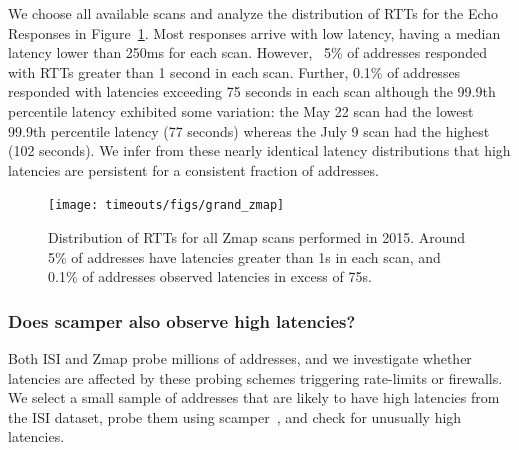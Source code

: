 We choose all
available scans and 
analyze the distribution of
RTTs for the Echo Responses in
Figure~\ref{fig:grand_zmap}. 
%
Most responses arrive with low latency, having a median latency lower than
250ms for each scan.
%
However, ~5\% of addresses responded with RTTs greater than 1 second
in each scan. Further, 0.1\% of addresses responded with latencies exceeding
75 seconds in each scan although the 99.9th percentile
latency exhibited some variation: the May 22 scan had the lowest 99.9th percentile
latency (77 seconds) whereas the July 9 scan had the highest (102 seconds).
%
We infer from these nearly identical latency distributions that high latencies are persistent for a consistent fraction of addresses.



\begin{figure}[tb]
\begin{center}
\texttt{[image: timeouts/figs/grand\_zmap]}
\end{center}
\caption{\label{fig:grand_zmap}%
Distribution of RTTs for all Zmap scans performed in 2015. Around 5\%
of addresses have latencies greater than 1s in each scan, and 0.1\% of addresses observed latencies in excess of 75s.
}
\end{figure}


\subsubsection*{Does scamper also observe high latencies?}
Both ISI and Zmap probe millions of addresses, and we investigate
whether latencies are affected by these probing schemes
triggering rate-limits or firewalls. We select a small sample of
addresses that are likely to have high latencies from the
ISI dataset, probe them using scamper~\cite{luckie2010scamper}, and check for unusually high latencies.

